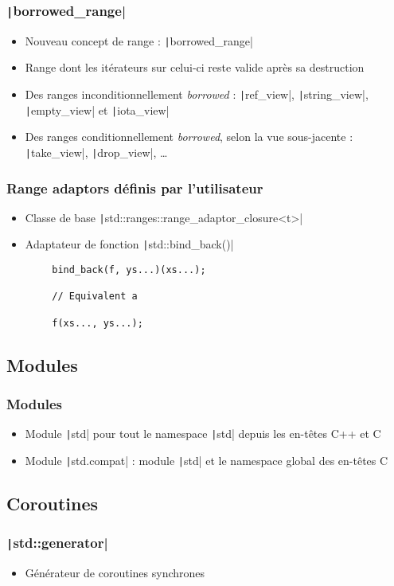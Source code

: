 \documentclass[C++.tex]{subfiles}
\begin{document}
\begin{frame}[fragile]
	\frametitle{\texttt|borrowed_range|}
	\begin{itemize}
		\item Nouveau concept de range : \texttt|borrowed_range|
		\item Range dont les itérateurs sur celui-ci reste valide après sa destruction
		\item Des ranges inconditionnellement \textit{borrowed} : \texttt|ref_view|, \texttt|string_view|, \texttt|empty_view| et \texttt|iota_view|
		\item Des ranges conditionnellement \textit{borrowed}, selon la vue sous-jacente : \texttt|take_view|, \texttt|drop_view|, \ldots{}
	\end{itemize}
\end{frame}

\begin{frame}[fragile]
	\frametitle{Range adaptors définis par l'utilisateur}
	\begin{itemize}
		\item Classe de base \texttt|std::ranges::range_adaptor_closure<t>|
		\item Adaptateur de fonction \texttt|std::bind_back()|
	\end{itemize}

	\begin{verbatim}
		bind_back(f, ys...)(xs...);

		// Equivalent a

		f(xs..., ys...);
	\end{verbatim}
\end{frame}

\subsection*{Modules}
\begin{frame}[fragile]
	\frametitle{Modules}
	\begin{itemize}
		\item Module \texttt|std| pour tout le namespace \texttt|std| depuis les en-têtes C++ et C
		\item Module \texttt|std.compat| : module \texttt|std| et le namespace global des en-têtes C
	\end{itemize}
\end{frame}

\subsection*{Coroutines}
\begin{frame}[fragile]
	\frametitle{\texttt|std::generator|}
	\begin{itemize}
		\item Générateur de coroutines synchrones
	\end{itemize}
\end{frame}
\end{document}
